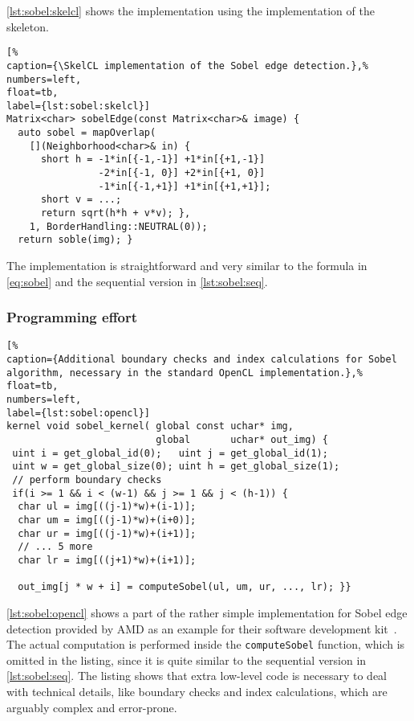 \autoref{lst:sobel:skelcl} shows the \SkelCL implementation using the  implementation of the \stencil skeleton.
%
\begin{lstlisting}[%
caption={\SkelCL implementation of the Sobel edge detection.},%
numbers=left,
float=tb,
label={lst:sobel:skelcl}]
Matrix<char> sobelEdge(const Matrix<char>& image) {
  auto sobel = mapOverlap(
    [](Neighborhood<char>& in) {
      short h = -1*in[{-1,-1}] +1*in[{+1,-1}]
                -2*in[{-1, 0}] +2*in[{+1, 0}]
                -1*in[{-1,+1}] +1*in[{+1,+1}];
      short v = ...;
      return sqrt(h*h + v*v); },
    1, BorderHandling::NEUTRAL(0));
  return soble(img); }
\end{lstlisting}
%
The implementation is straightforward and very similar to the formula in \autoref{eq:sobel} and the sequential version in \autoref{lst:sobel:seq}.

\subsubsection*{Programming effort}

\begin{lstlisting}[%
caption={Additional boundary checks and index calculations for Sobel algorithm, necessary in the standard OpenCL implementation.},%
float=tb,
numbers=left,
label={lst:sobel:opencl}]
kernel void sobel_kernel( global const uchar* img,
                          global       uchar* out_img) {
 uint i = get_global_id(0);   uint j = get_global_id(1);
 uint w = get_global_size(0); uint h = get_global_size(1);
 // perform boundary checks
 if(i >= 1 && i < (w-1) && j >= 1 && j < (h-1)) {
  char ul = img[((j-1)*w)+(i-1)];
  char um = img[((j-1)*w)+(i+0)];
  char ur = img[((j-1)*w)+(i+1)];
  // ... 5 more
  char lr = img[((j+1)*w)+(i+1)];

  out_img[j * w + i] = computeSobel(ul, um, ur, ..., lr); }}
\end{lstlisting}

\autoref{lst:sobel:opencl} shows a part of the rather simple \OpenCL implementation for Sobel edge detection provided by AMD as an example for their software development kit~\cite{AMDSDK}.
The actual computation is performed inside the \texttt{computeSobel} function, which is omitted in the listing, since it is quite similar to the sequential version in \autoref{lst:sobel:seq}.
The listing shows that extra low-level code is necessary to deal with technical details, like boundary checks and index calculations, which are arguably complex and error-prone.

